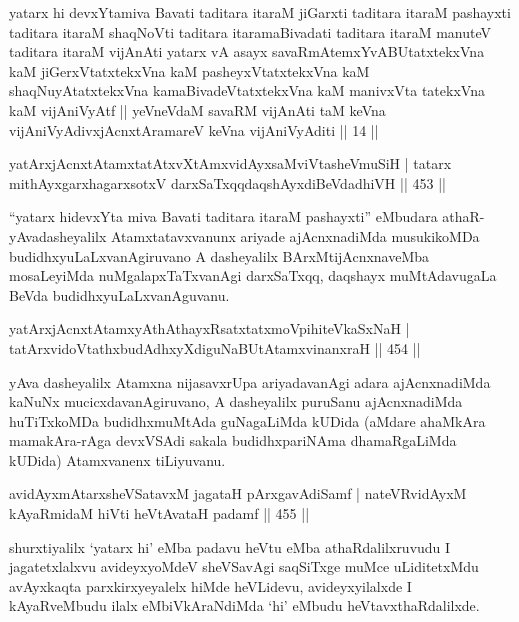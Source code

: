 \begin{kandikeshl}
yatarx hi devxYtamiva Bavati taditara itaraM jiGarxti taditara itaraM pashayxti taditara itaraM shaqNoVti taditara itaramaBivadati taditara itaraM manuteV taditara itaraM vijAnAti yatarx vA asayx savaRmAtemxYvABUtatxtekxVna kaM jiGerxVtatxtekxVna kaM pasheyxVtatxtekxVna kaM shaqNuyAtatxtekxVna kamaBivadeVtatxtekxVna kaM manivxVta tatekxVna kaM vijAniVyAtf || yeVneVdaM savaRM vijAnAti taM keVna vijAniVyAdivxjAcnxtAramareV keVna vijAniVyAditi || 14 ||
\end{kandikeshl}

\begin{shl}
yatArxjAcnxtAtamxtatAtxvXtAmx\s vidAyxsaMviVtasheVmuSiH |
tatarx mithAyxgarxhagarxsotxV darxSaTxqqdaqshAyxdiBeVdadhiVH \hfill || 453 ||
\end{shl}

\begin{artha}
``yatarx hidevxYta miva Bavati taditara itaraM pashayxti'' eMbudara athaR- yAvadasheyalilx Atamxtatavxvanunx ariyade ajAcnxnadiMda musukikoMDa budidhxyuLaLxvanAgiruvano A dasheyalilx BArxMtijAcnxnaveMba mosaLeyiMda nuMgalapxTaTxvanAgi darxSaTxqq, daqshayx muMtAdavugaLa BeVda budidhxyuLaLxvanAguvanu.
\end{artha}

\begin{shl}
yatArxjAcnxtAtamxyAthAthayxRsatxtatxmoVpihiteVkaSxNaH |
tatArxvidoVtathxbudAdhxyXdiguNaBUtAtamxvinanxraH \hfill || 454 ||
\end{shl}

\begin{artha}
yAva dasheyalilx Atamxna nijasavxrUpa ariyadavanAgi adara ajAcnxnadiMda kaNuNx mucicxdavanAgiruvano, A dasheyalilx puruSanu ajAcnxnadiMda huTiTxkoMDa budidhxmuMtAda guNagaLiMda kUDida (aMdare ahaMkAra mamakAra-rAga devxVSAdi sakala budidhxpariNAma dhamaRgaLiMda kUDida) Atamxvanenx tiLiyuvanu.
\end{artha}


\begin{shl}
avidAyxmAtarxsheVSatavxM jagataH pArxgavAdiSamf |
nateVR\s vidAyxM kAyaRmidaM hiVti heVtAvataH padamf \hfill || 455 ||
\end{shl}

\begin{artha}
shurxtiyalilx `yatarx hi' eMba padavu heVtu eMba athaRdalilxruvudu I jagatetxlalxvu avideyxyoMdeV sheVSavAgi saqSiTxge muMce uLiditetxMdu avAyxkaqta parxkirxyeyalelx hiMde heVLidevu, avideyxyilalxde I kAyaRveMbudu ilalx eMbiVkAraNdiMda `hi' eMbudu heVtavxthaRdalilxde.
\end{artha}

